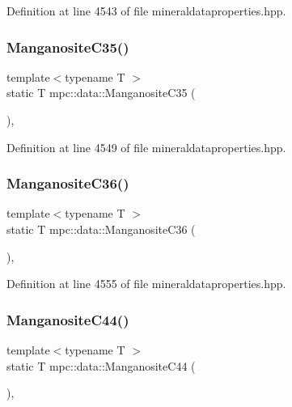 Definition at line 4543 of file mineraldataproperties.\+hpp.

\mbox{\label{namespacempc_1_1data_ad2d0a52c6dd9a61c7c91a37a380dfca8}} 
\subsubsection{\texorpdfstring{Manganosite\+C35()}{ManganositeC35()}}
{\footnotesize\ttfamily template$<$typename T $>$ \\
static T mpc\+::data\+::\+Manganosite\+C35 (\begin{DoxyParamCaption}{ }\end{DoxyParamCaption})\hspace{0.3cm}{\ttfamily [inline]}, {\ttfamily [static]}}



Definition at line 4549 of file mineraldataproperties.\+hpp.

\mbox{\label{namespacempc_1_1data_ad81b093dedf34da284448282f87ef2d6}} 
\subsubsection{\texorpdfstring{Manganosite\+C36()}{ManganositeC36()}}
{\footnotesize\ttfamily template$<$typename T $>$ \\
static T mpc\+::data\+::\+Manganosite\+C36 (\begin{DoxyParamCaption}{ }\end{DoxyParamCaption})\hspace{0.3cm}{\ttfamily [inline]}, {\ttfamily [static]}}



Definition at line 4555 of file mineraldataproperties.\+hpp.

\mbox{\label{namespacempc_1_1data_a58aaf130791119a1e12954590542f812}} 
\subsubsection{\texorpdfstring{Manganosite\+C44()}{ManganositeC44()}}
{\footnotesize\ttfamily template$<$typename T $>$ \\
static T mpc\+::data\+::\+Manganosite\+C44 (\begin{DoxyParamCaption}{ }\end{DoxyParamCaption})\hspace{0.3cm}{\ttfamily [inline]}, {\ttfamily [static]}}




